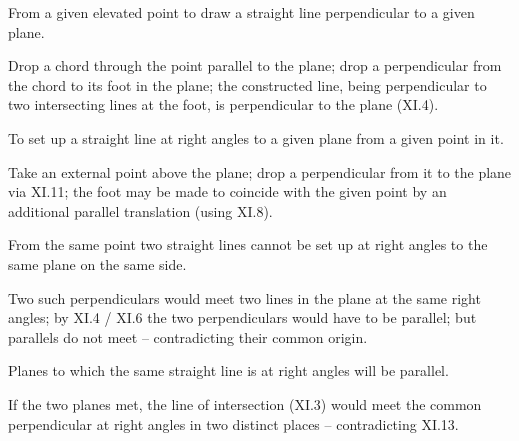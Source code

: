 \begin{claim}
\label{prop:XI.11}
From a given elevated point to draw a straight line perpendicular to
a given plane.
\end{claim}
\begin{evidence}[Proof of XI.11]
\label{ev:XI.11}
Drop a chord through the point parallel to the plane; drop a
perpendicular from the chord to its foot in the plane; the
constructed line, being perpendicular to two intersecting lines at
the foot, is perpendicular to the plane (XI.4).
\end{evidence}

\begin{claim}
\label{prop:XI.12}
To set up a straight line at right angles to a given plane from a
given point in it.
\end{claim}
\begin{evidence}[Proof of XI.12]
\label{ev:XI.12}
Take an external point above the plane; drop a perpendicular from it
to the plane via XI.11; the foot may be made to coincide with the
given point by an additional parallel translation (using XI.8).
\end{evidence}

\begin{claim}
\label{prop:XI.13}
From the same point two straight lines cannot be set up at right
angles to the same plane on the same side.
\end{claim}
\begin{evidence}[Proof of XI.13]
\label{ev:XI.13}
Two such perpendiculars would meet two lines in the plane at the
same right angles; by XI.4 / XI.6 the two perpendiculars would have
to be parallel; but parallels do not meet -- contradicting their
common origin.
\end{evidence}

\begin{claim}
\label{prop:XI.14}
Planes to which the same straight line is at right angles will be
parallel.
\end{claim}
\begin{evidence}[Proof of XI.14]
\label{ev:XI.14}
If the two planes met, the line of intersection (XI.3) would meet
the common perpendicular at right angles in two distinct places --
contradicting XI.13.
\end{evidence}

